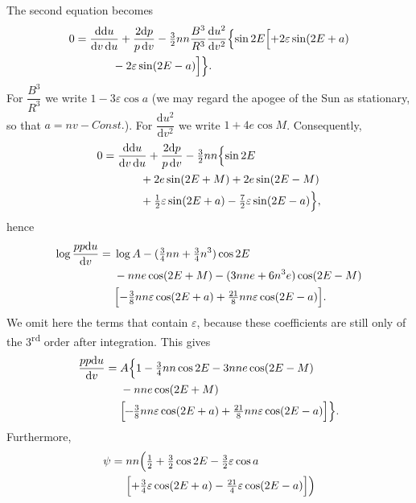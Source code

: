 \clearpage
\begingroup
{}
\renewcommand{\headrulewidth}{0pt}
\par\noindent\hspace*{\parindent}The second equation becomes
\[
\begin{aligned}
0={}&\frac{\mathrm{dd}u}{\mathrm{d}v\,\mathrm{d}u}
+\frac{2\mathrm{d}p}{p\,\mathrm{d}v}
-\tfrac32nn\frac{B^3}{R^3}\frac{\mathrm{d}u^2}{\mathrm{d}v^2}\Bigl\{\sin2E\Bigl[+2\varepsilon\sin(2E+a)\\
&\qquad-2\varepsilon\sin(2E-a)\Bigr]\Bigr\}.
\end{aligned}
\]
\noindent For \(\dfrac{B^3}{R^3}\) we write \(1-3\varepsilon\cos a\)
(we may regard the apogee of the Sun as stationary, so that
\(a=nv-\mathit{Const.}\)). For \(\dfrac{\mathrm{d}u^2}{\mathrm{d}v^2}\)
we write \(1+4e\cos M\). Consequently,
\[
\begin{aligned}
0={}&\frac{\mathrm{dd}u}{\mathrm{d}v\,\mathrm{d}u}
+\frac{2\mathrm{d}p}{p\,\mathrm{d}v}-\tfrac32nn\Bigl\{\sin2E\\
&\qquad+2e\sin(2E+M)+2e\sin(2E-M)\\
&\qquad+\tfrac12\varepsilon\sin(2E+a)-\tfrac72\varepsilon\sin(2E-a)\Bigr\},
\end{aligned}
\]
\noindent hence
\[
\begin{aligned}
\log\frac{pp\mathrm{d}u}{\mathrm{d}v}={}&\log A-(\tfrac34nn+\tfrac34n^3)\cos2E\\
&-nne\cos(2E+M)-(3nne+6n^3e)\cos(2E-M)\\
&\Bigl[-\tfrac38nn\varepsilon\cos(2E+a)
+\tfrac{21}{8}nn\varepsilon\cos(2E-a)\Bigr].
\end{aligned}
\]
\noindent We omit here the terms that contain \(\varepsilon\), because these
coefficients are still only of the 3\textsuperscript{rd} order after integration.
This gives
\[
\begin{aligned}
\frac{pp\mathrm{d}u}{\mathrm{d}v}={}&A\Bigl\{1-\tfrac34nn\cos2E-3nne\cos(2E-M)\\
&-nne\cos(2E+M)\\
&\Bigl[\mathbin{\vcenter{\hbox{\rule{.33em}{.04em}\kern.025em\rule{.33em}{.04em}}}}
\tfrac38nn\varepsilon\cos(2E+a)
+\tfrac{21}{8}nn\varepsilon\cos(2E-a)\Bigr]\Bigr\}.
\end{aligned}
\]
\noindent Furthermore,
\[
\begin{aligned}
\psi={}&nn\Bigl(\tfrac12+\tfrac32\cos2E-\tfrac32\varepsilon\cos a\\
&\Bigl[+\tfrac34\varepsilon\cos(2E+a)-\tfrac{21}{4}\varepsilon\cos(2E-a)\Bigr]\Bigr)
\end{aligned}
\]
